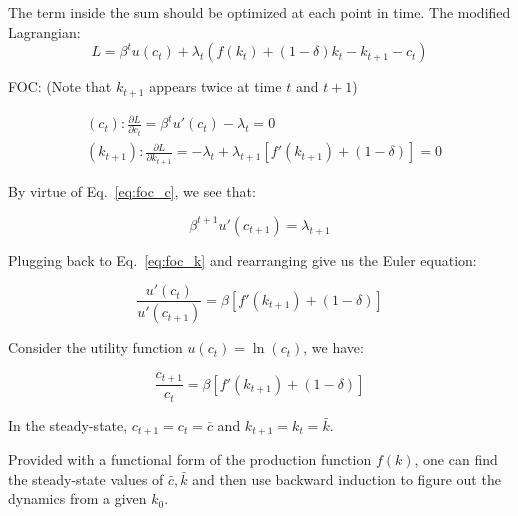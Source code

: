 \documentclass[11pt,a4paper]{book}
\theoremstyle{definition}\newtheorem{definition}{Definition}
\theoremstyle{definition}\newtheorem{fact}{Fact}
\theoremstyle{definition}\newtheorem{remark}{Remark}
\theoremstyle{definition}\newtheorem{ex}{Ex.}
\theoremstyle{definition}\newtheorem{project}{Project}
\theoremstyle{definition}\newtheorem{problem}{Problem}
\theoremstyle{definition}\newtheorem{example}{Example}
\numberwithin{theorem}{section}
\numberwithin{corollary}{chapter}
\numberwithin{assumption}{chapter}
\numberwithin{definition}{chapter}
\numberwithin{prop}{chapter}
\numberwithin{notation}{chapter}
\numberwithin{problem}{chapter}
\numberwithin{example}{chapter}
\numberwithin{fact}{chapter}
\numberwithin{ex}{chapter}
\begin{document}
The term inside the sum should be optimized at each point in time. The modified Lagrangian:
$$
    L = \beta^t u(c_t) + \lambda_t \left( f(k_t) + (1- \delta) k_t - k_{t+1} - c_t \right)
$$

FOC: (Note that $k_{t+1}$ appears twice at time $t$ and $t+1$)

\begin{align}
      &(c_t): \frac{\partial L}{\partial c_t} = \beta^t u'(c_t) - \lambda_t = 0  \label{eq:foc_c}  \ \                                                \\
      &(k_{t+1}): \frac{\partial L}{\partial k_{t+1}} = -\lambda_t + \lambda_{t+1} \left[ f'(k_{t+1}) + (1-\delta) \right] = 0 \label{eq:foc_k} \ 
\end{align}

By virtue of Eq.~\eqref{eq:foc_c}, we see that:

$$
    \beta^{t+1}u'(c_{t+1}) = \lambda_{t+1}
$$

Plugging back to Eq.~\eqref{eq:foc_k} and rearranging give us the Euler equation:

$$
    \frac{u'(c_t)}{u'(c_{t+1})} = \beta \left[ f'(k_{t+1}) + (1-\delta) \right]
$$

Consider the utility function $u(c_t) = \ln(c_t)$, we have:

$$
    \frac{c_{t+1}}{c_t} = \beta \left[f'(k_{t+1}) + (1-\delta)\right]
$$

In the steady-state, $c_{t+1} = c_t = \bar{c}$ and $k_{t+1} = k_t = \bar{k}$.  

Provided with a functional form of the production function $f(k)$, one can find the steady-state values of $\bar{c}, \bar{k}$ and then use backward induction to figure out the dynamics from a given $k_0$.
	
\end{document}
